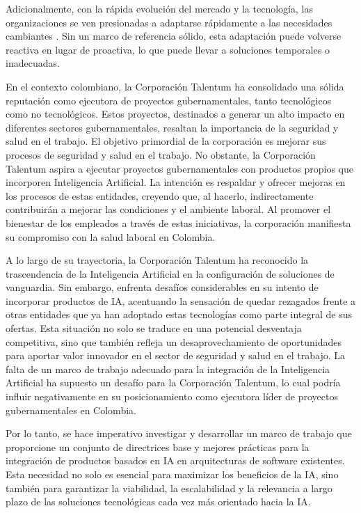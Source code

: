 Adicionalmente, con la rápida evolución del mercado y la tecnología, las organizaciones se ven presionadas a adaptarse rápidamente a las necesidades cambiantes \citep{Wang2016ImplementingOutlook}. Sin un marco de referencia sólido, esta adaptación puede volverse reactiva en lugar de proactiva, lo que puede llevar a soluciones temporales o inadecuadas.

En el contexto colombiano, la Corporación Talentum ha consolidado una sólida reputación como ejecutora de proyectos gubernamentales, tanto tecnológicos como no tecnológicos. Estos proyectos, destinados a generar un alto impacto en diferentes sectores gubernamentales, resaltan la importancia de la seguridad y salud en el trabajo. El objetivo primordial de la corporación es mejorar sus procesos de seguridad y salud en el trabajo. No obstante, la Corporación Talentum aspira a ejecutar proyectos gubernamentales con productos propios que incorporen Inteligencia Artificial. La intención es respaldar y ofrecer mejoras en los procesos de estas entidades, creyendo que, al hacerlo, indirectamente contribuirán a mejorar las condiciones y el ambiente laboral. Al promover el bienestar de los empleados a través de estas iniciativas, la corporación manifiesta su compromiso con la salud laboral en Colombia.

A lo largo de su trayectoria, la Corporación Talentum ha reconocido la trascendencia de la Inteligencia Artificial en la configuración de soluciones de vanguardia. Sin embargo, enfrenta desafíos considerables en su intento de incorporar productos de IA, acentuando la sensación de quedar rezagados frente a otras entidades que ya han adoptado estas tecnologías como parte integral de sus ofertas. Esta situación no solo se traduce en una potencial desventaja competitiva, sino que también refleja un desaprovechamiento de oportunidades para aportar valor innovador en el sector de seguridad y salud en el trabajo. La falta de un marco de trabajo adecuado para la integración de la Inteligencia Artificial ha supuesto un desafío para la Corporación Talentum, lo cual podría influir negativamente en su posicionamiento como ejecutora líder de proyectos gubernamentales en Colombia.

Por lo tanto, se hace imperativo investigar y desarrollar un marco de trabajo que proporcione un conjunto de directrices base y mejores prácticas para la integración de productos basados en IA en arquitecturas de software existentes. Esta necesidad no solo es esencial para maximizar los beneficios de la IA, sino también para garantizar la viabilidad, la escalabilidad y la relevancia a largo plazo de las soluciones tecnológicas cada vez más orientado hacia la IA.

